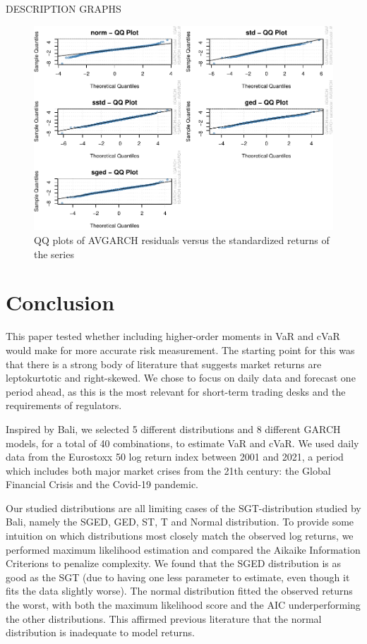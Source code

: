 \documentclass[a4paper, twoside]{templates/ociamthesis}
\begin{document}
DESCRIPTION GRAPHS

\begin{figure}[h]

{\centering \includegraphics[width=1\linewidth]{_main_files/figure-latex/figuresqq-1} 

}

\caption{QQ plots of AVGARCH residuals versus the standardized returns of the series}\label{fig:figuresqq}
\end{figure}

\hypertarget{Conclusion}{%
\chapter{Conclusion}\label{Conclusion}}

This paper tested whether including higher-order moments in VaR and cVaR would make for more accurate risk measurement. The starting point for this was that there is a strong body of literature that suggests market returns are leptokurtotic and right-skewed. We chose to focus on daily data and forecast one period ahead, as this is the most relevant for short-term trading desks and the requirements of regulators.

Inspired by Bali, we selected 5 different distributions and 8 different GARCH models, for a total of 40 combinations, to estimate VaR and cVaR. We used daily data from the Eurostoxx 50 log return index between 2001 and 2021, a period which includes both major market crises from the 21th century: the Global Financial Crisis and the Covid-19 pandemic.

Our studied distributions are all limiting cases of the SGT-distribution studied by Bali, namely the SGED, GED, ST, T and Normal distribution. To provide some intuition on which distributions most closely match the observed log returns, we performed maximum likelihood estimation and compared the Aikaike Information Criterions to penalize complexity. We found that the SGED distribution is as good as the SGT (due to having one less parameter to estimate, even though it fits the data slightly worse). The normal distribution fitted the observed returns the worst, with both the maximum likelihood score and the AIC underperforming the other distributions. This affirmed previous literature that the normal distribution is inadequate to model returns.
\end{document}
